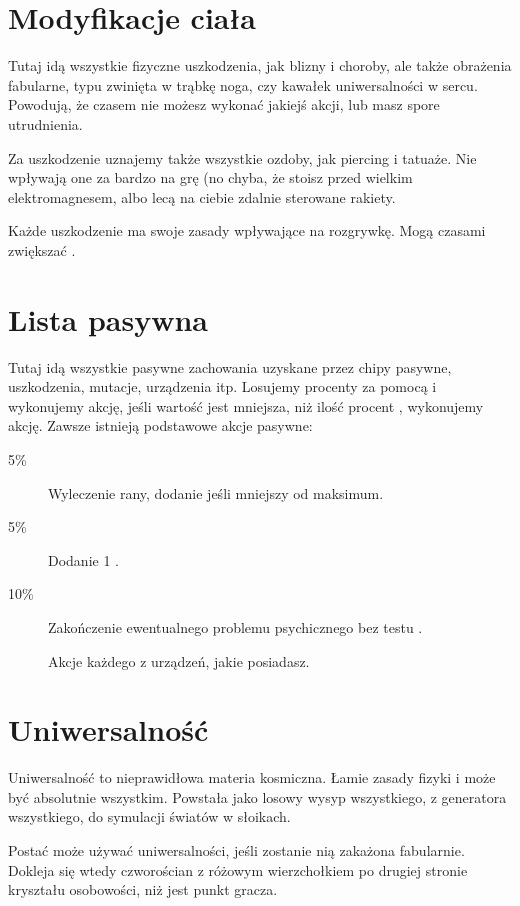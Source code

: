 \section{Modyfikacje ciała}
Tutaj idą wszystkie fizyczne uszkodzenia, jak blizny i choroby, ale także obrażenia fabularne, typu zwinięta w trąbkę noga, czy kawałek uniwersalności w sercu.
Powodują, że czasem nie możesz wykonać jakiejś akcji, lub masz spore utrudnienia.

Za uszkodzenie uznajemy także wszystkie ozdoby, jak piercing i tatuaże.
Nie wpływają one za bardzo na grę (no chyba, że stoisz przed wielkim elektromagnesem, albo lecą na ciebie zdalnie sterowane rakiety.

Każde uszkodzenie ma swoje zasady wpływające na rozgrywkę.
Mogą czasami zwiększać \abnkp{}.

\section{Lista pasywna}
Tutaj idą wszystkie pasywne zachowania uzyskane przez chipy pasywne, uszkodzenia, mutacje, urządzenia itp.
Losujemy procenty za pomocą \dc{} i wykonujemy akcję, jeśli wartość jest mniejsza, niż ilość procent , wykonujemy akcję.
Zawsze istnieją podstawowe akcje pasywne:
\begin{description}
	\item[5\%] Wyleczenie rany, dodanie \abzyc{} jeśli mniejszy od maksimum.
	\item[5\%] Dodanie 1 \abkar{}.
	\item[10\%] Zakończenie ewentualnego problemu psychicznego bez testu \abh{}.
	\item[] Akcje każdego z urządzeń, jakie posiadasz.
\end{description}

\section{Uniwersalność}
Uniwersalność to nieprawidłowa materia kosmiczna. Łamie zasady fizyki i może być absolutnie wszystkim.
Powstała jako losowy wysyp wszystkiego, z generatora wszystkiego, do symulacji światów w słoikach.

Postać może używać uniwersalności, jeśli zostanie nią zakażona fabularnie.
Dokleja się wtedy czworościan z różowym wierzchołkiem \abu{} po drugiej stronie kryształu osobowości, niż jest punkt gracza.


